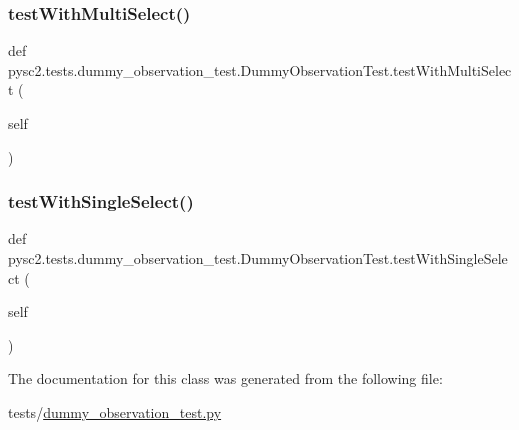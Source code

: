 \subsubsection{\texorpdfstring{test\+With\+Multi\+Select()}{testWithMultiSelect()}}
{\footnotesize\ttfamily def pysc2.\+tests.\+dummy\+\_\+observation\+\_\+test.\+Dummy\+Observation\+Test.\+test\+With\+Multi\+Select (\begin{DoxyParamCaption}\item[{}]{self }\end{DoxyParamCaption})}

\mbox{\label{classpysc2_1_1tests_1_1dummy__observation__test_1_1_dummy_observation_test_a5c63e3a39253ff187c1287501a5e6aeb}} 
\subsubsection{\texorpdfstring{test\+With\+Single\+Select()}{testWithSingleSelect()}}
{\footnotesize\ttfamily def pysc2.\+tests.\+dummy\+\_\+observation\+\_\+test.\+Dummy\+Observation\+Test.\+test\+With\+Single\+Select (\begin{DoxyParamCaption}\item[{}]{self }\end{DoxyParamCaption})}



The documentation for this class was generated from the following file\+:\begin{DoxyCompactItemize}
\item 
tests/\mbox{\hyperlink{dummy__observation__test_8py}{dummy\+\_\+observation\+\_\+test.\+py}}\end{DoxyCompactItemize}
